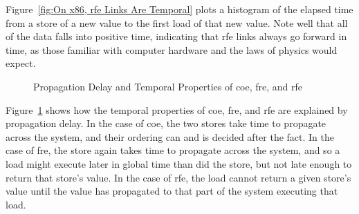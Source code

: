 \documentclass[10]{article}
\begin{document}
Figure~\ref{fig:On x86, rfe Links Are Temporal}
plots a histogram of the elapsed time from a store of a new value
to the first load of that new value.
Note well that all of the data falls into positive time, indicating
that rfe links always go forward in time, as those familiar with
computer hardware and the laws of physics would expect.

\begin{figure}[tb]
\begin{center}
\caption{Propagation Delay and Temporal Properties of coe, fre, and rfe}
\label{fig:Propagation Delay and Temporal Properties of coe, fre, and rfe}
\end{center}
\end{figure}

Figure~\ref{fig:Propagation Delay and Temporal Properties of coe, fre, and rfe}
shows how the temporal properties of coe, fre, and rfe are explained
by propagation delay.
In the case of coe, the two stores take time to propagate across the
system, and their ordering can and is decided after the fact.
In the case of fre, the store again takes time to propagate across
the system, and so a load might execute later in global time than
did the store, but not late enough to return that store's value.
In the case of rfe, the load cannot return a given store's value until
the value has propagated to that part of the system executing that load.
\end{document}
